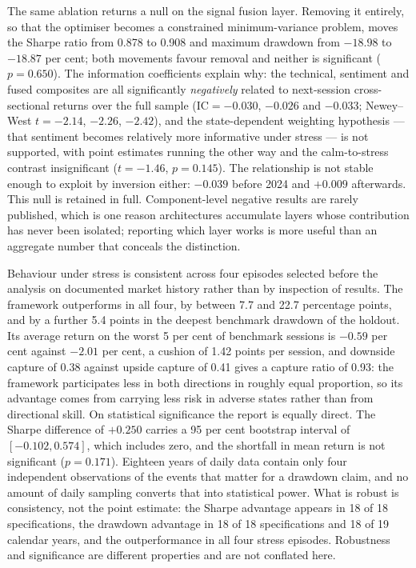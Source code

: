 The same ablation returns a null on the signal fusion layer. Removing it entirely, so that the
optimiser becomes a constrained minimum-variance problem, moves the Sharpe ratio from 0.878 to
0.908 and maximum drawdown from $-18.98$ to $-18.87$ per cent; both movements favour removal
and neither is significant ($p = 0.650$). The information coefficients explain why: the
technical, sentiment and fused composites are all significantly \emph{negatively} related to
next-session cross-sectional returns over the full sample ($\mathrm{IC} = -0.030$, $-0.026$ and
$-0.033$; Newey--West $t = -2.14$, $-2.26$, $-2.42$), and the state-dependent weighting
hypothesis --- that sentiment becomes relatively more informative under stress --- is not
supported, with point estimates running the other way and the calm-to-stress contrast
insignificant ($t = -1.46$, $p = 0.145$). The relationship is not stable enough to exploit by
inversion either: $-0.039$ before 2024 and $+0.009$ afterwards. This null is retained in full.
Component-level negative results are rarely published, which is one reason architectures
accumulate layers whose contribution has never been isolated; reporting which layer works is
more useful than an aggregate number that conceals the distinction.

Behaviour under stress is consistent across four episodes selected before the analysis on
documented market history rather than by inspection of results. The framework outperforms in
all four, by between 7.7 and 22.7 percentage points, and by a further 5.4 points in the deepest
benchmark drawdown of the holdout. Its average return on the worst 5 per cent of benchmark
sessions is $-0.59$ per cent against $-2.01$ per cent, a cushion of 1.42 points per session,
and downside capture of 0.38 against upside capture of 0.41 gives a capture ratio of 0.93: the
framework participates less in both directions in roughly equal proportion, so its advantage
comes from carrying less risk in adverse states rather than from directional skill. On
statistical significance the report is equally direct. The Sharpe difference of $+0.250$
carries a 95 per cent bootstrap interval of $[-0.102, 0.574]$, which includes zero, and the
shortfall in mean return is not significant ($p = 0.171$). Eighteen years of daily data contain
only four independent observations of the events that matter for a drawdown claim, and no
amount of daily sampling converts that into statistical power. What is robust is consistency,
not the point estimate: the Sharpe advantage appears in 18 of 18 specifications, the drawdown
advantage in 18 of 18 specifications and 18 of 19 calendar years, and the outperformance in all
four stress episodes. Robustness and significance are different properties and are not
conflated here.

